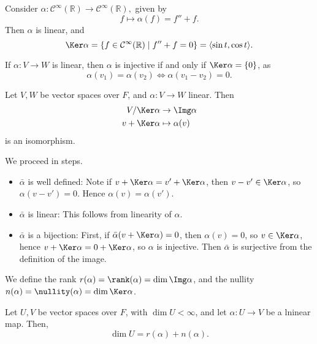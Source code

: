 \documentclass[12pt]{article}
\begin{document}
\begin{exbox}
	Consider $\alpha : \mathcal{C}^{\infty}(\mathbb{R}) \to \mathcal{C}^{\infty}(\mathbb{R}),$ given by
	\[
		f \mapsto \alpha(f) = f'' + f
	.\]
	Then $\alpha$ is linear, and
	\[
		\Ker \alpha = \{f \in \mathcal{C}^{\infty}(\mathbb{R}) \mid f'' + f = 0\} = \langle \sin t, \cos t \rangle
	.\]
\end{exbox}

\begin{remark}
	If $\alpha : V \to W$ is linear, then $\alpha$ is injective if and only if $\Ker \alpha = \{0\}$, as
	\[
		\alpha(v_1) = \alpha(v_2) \iff \alpha(v_1 - v_2) = 0
	.\]
\end{remark}

\begin{theorem}
	Let $V, W$ be vector spaces over $F$, and $\alpha : V \to W$ linear. Then
	\begin{align*}
		V/\Ker \alpha &\to \Img \alpha \\
		v + \Ker \alpha &\mapsto \alpha(v)
	\end{align*}
	is an isomorphism.
\end{theorem}

\begin{proofbox}
	We proceed in steps.
\begin{itemize}
	\item $\bar \alpha$ is well defined: Note if $v + \Ker \alpha = v' + \Ker \alpha$, then $v - v' \in \Ker \alpha$, so $\alpha(v - v') = 0$. Hence $\alpha(v) = \alpha(v')$.
	\item $\bar \alpha$ is linear: This follows from linearity of $\alpha$.
	\item $\bar \alpha$ is a bijection: First, if $\bar \alpha (v + \Ker \alpha) = 0$, then $\alpha(v) = 0$, so $v \in \Ker \alpha$, hence $v + \Ker \alpha = 0 + \Ker \alpha$, so $\alpha$ is injective. Then $\bar \alpha$ is surjective from the definition of the image.
\end{itemize}
\end{proofbox}

\begin{definition}
	We define the rank $r(\alpha) = \rank(\alpha) = \dim \Img \alpha$, and the nullity $n(\alpha) = \nullity(\alpha) = \dim \Ker \alpha$.
\end{definition}

\begin{theorem}
	Let $U, V$ be vector spaces over $F$, with $\dim U < \infty$, and let $\alpha : U \to V$ be a lninear map. Then,
	\[
		\dim U = r(\alpha) + n(\alpha)
	.\]
\end{theorem}
\end{document}

